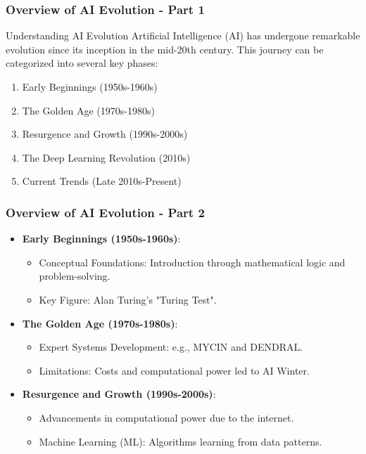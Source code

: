 \documentclass{beamer}
\begin{document}
\begin{frame}[fragile]
    \frametitle{Overview of AI Evolution - Part 1}
    \begin{block}{Understanding AI Evolution}
        Artificial Intelligence (AI) has undergone remarkable evolution since its inception in the mid-20th century. This journey can be categorized into several key phases:
    \end{block}
    
    \begin{enumerate}
        \item Early Beginnings (1950s-1960s)
        \item The Golden Age (1970s-1980s)
        \item Resurgence and Growth (1990s-2000s)
        \item The Deep Learning Revolution (2010s)
        \item Current Trends (Late 2010s-Present)
    \end{enumerate}
\end{frame}

\begin{frame}[fragile]
    \frametitle{Overview of AI Evolution - Part 2}
    \begin{itemize}
        \item \textbf{Early Beginnings (1950s-1960s)}:
        \begin{itemize}
            \item Conceptual Foundations: Introduction through mathematical logic and problem-solving.
            \item Key Figure: Alan Turing's "Turing Test".
        \end{itemize}

        \item \textbf{The Golden Age (1970s-1980s)}:
        \begin{itemize}
            \item Expert Systems Development: e.g., MYCIN and DENDRAL.
            \item Limitations: Costs and computational power led to AI Winter.
        \end{itemize}

        \item \textbf{Resurgence and Growth (1990s-2000s)}:
        \begin{itemize}
            \item Advancements in computational power due to the internet.
            \item Machine Learning (ML): Algorithms learning from data patterns.
        \end{itemize}
    \end{itemize}
\end{frame}
\end{document}
